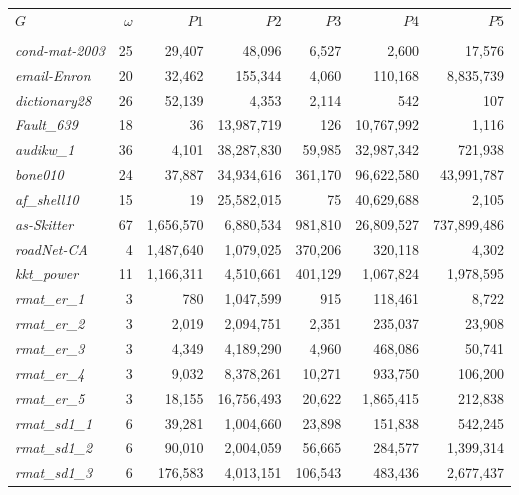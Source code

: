 \begin{table}[!hbt]
\begin{tabular}{l@{\hspace{6pt}}r@{\hspace{6pt}}|@{\hspace{6pt}}r@{\hspace{6pt}}r@{\hspace{6pt}}r@{\hspace{6pt}}r@{\hspace{6pt}}r}
\toprule\toprule
$G$ 				& $\omega$ 	& 	$P1$ 		&	$P2$		& 	$P3$ 		& 	$P4$ 		&	$P5$		\vspace{-4pt} \\
				& 			&		 		& 		 		&				& 			 	&				\\ \hline \hline
{\it cond-mat-2003} 	& 	25 		& 	29,407 		&	48,096		&	6,527 		&	2,600		& 	17,576		\\
{\it email-Enron} 	& 	20 		& 	32,462 		&	155,344		&	4,060 		&	110,168		& 	8,835,739		\\ %
{\it dictionary28} 	& 	26 		& 	52,139		& 	4,353		&	2,114		&	542			& 	107			\\	
{\it Fault\_639}		&	18		&	36			&	13,987,719	&	126			&	10,767,992	&	1,116		\\
{\it audikw\_1}		&	36		&	4,101		&	38,287,830	&	59,985		&	32,987,342	&	721,938		\\
{\it bone010}		&	24		&	37,887		&	34,934,616	&	361,170		&	96,622,580	&	43,991,787	\\ %
{\it af\_shell10}		&	15		&	19			&	25,582,015	&	75			&	40,629,688 &	2,105		\\
{\it as-Skitter}		&	67		&	1,656,570		&	6,880,534		&	981,810		& 26,809,527&	737,899,486	\\ %
{\it roadNet-CA}	&	4		&	1,487,640		&	1,079,025		&	370,206		&	320,118		&	4,302		\\ %
{\it kkt\_power}		&	11		&	1,166,311		&	4,510,661		&	401,129		&	1,067,824		&	1,978,595		\\ %
\midrule
{\it rmat\_er\_1}		&	3		&	780			&	1,047,599		&	915			&	118,461		&	8,722		\\
{\it rmat\_er\_2}		&	3		&	2,019		&	2,094,751		&	2,351		&	235,037		&	23,908		\\
{\it rmat\_er\_3}		&	3		&	4,349		&	4,189,290		&	4,960		&	468,086		&	50,741		\\
{\it rmat\_er\_4}		&	3		&	9,032		&	8,378,261		&	10,271		&	933,750		&	106,200		\\
{\it rmat\_er\_5}		&	3		&	18,155		&	16,756,493	&	20,622		&	1,865,415		&	212,838		\\
\midrule
{\it rmat\_sd1\_1}	&	6		&	39,281		&	1,004,660		&	23,898		&	151,838		&	542,245		\\
{\it rmat\_sd1\_2}	&	6		&	90,010		&	2,004,059		&	56,665		&	284,577		&	1,399,314		\\ %
{\it rmat\_sd1\_3}	&	6		&	176,583		&	4,013,151		&	106,543		&	483,436		&	2,677,437		\\ %

\end{tabular}
\end{table}
